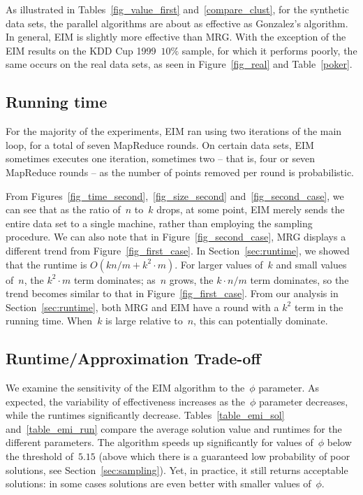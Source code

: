 \documentclass[11pt]{article}
\newcommand{\ours}{{\sc MRG}\xspace}
\newcommand{\ene}{{\sc EIM}\xspace}
\newcommand{\kdd}{{\sc KDD Cup}\xspace}
\begin{document}
As illustrated in Tables~\ref{fig_value_first} and~\ref{compare_clust},
for the synthetic data sets, the parallel algorithms
are about as effective as Gonzalez's algorithm.
In general, \ene is slightly more effective than \ours.
With the exception of the \ene results on the \kdd 1999~$10\%$ sample, for which it performs poorly,
the same occurs on the real data sets, as seen in Figure~\ref{fig_real} and Table~\ref{poker}.




\subsection{Running time}
For the majority of the experiments, \ene ran using two iterations of the main loop, for a total of seven MapReduce rounds.
On certain data sets,
\ene sometimes executes one iteration, sometimes two --
that is, four or seven
MapReduce rounds
 -- as the number of points removed per round is probabilistic.






From Figures~\ref{fig_time_second},~\ref{fig_size_second}
and~\ref{fig_second_case}, we can see that as the ratio of~$n$ to~$k$
drops, at some point, \ene merely sends the entire data set to a single
machine, rather than employing the sampling procedure.
We can also note that in Figure~\ref{fig_second_case}, \ours displays a different trend from Figure~\ref{fig_first_case}.
In Section~\ref{sec:runtime}, we showed that the runtime is $O(kn/m + k^2 \cdot m)$. 
For larger values of~$k$ and small values of~$n$, the $k^2\cdot m$ term
dominates;
as~$n$ grows, the $k\cdot n/m$ term dominates,
so the trend becomes similar to that in Figure~\ref{fig_first_case}. 
From our analysis in Section~\ref{sec:runtime}, both \ours and \ene have a
round with a $k^2$ term in the running time.
When~$k$ is large relative to~$n$,
this can potentially dominate.




 


\subsection{Runtime/Approximation Trade-off }

We examine the sensitivity of the \ene algorithm to the~$\phi$ parameter.
As expected, the variability of effectiveness increases
as the~$\phi$ parameter decreases,
while the runtimes significantly decrease. 
Tables~\ref{table_emi_sol} and~\ref{table_emi_run} compare
the average solution value and runtimes for the different parameters. 
The algorithm speeds up significantly 
for values of~$\phi$ below the threshold of~$5.15$ (above which there is a
guaranteed low probability of poor solutions, see Section~\ref{sec:sampling}).
Yet, in practice, it still returns acceptable solutions:
in some cases solutions are even better with smaller values of~$\phi$.
\end{document}
